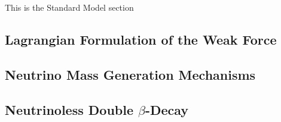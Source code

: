 This is the Standard Model section
\subsection{Lagrangian Formulation of the Weak Force}
\subsection{Neutrino Mass Generation Mechanisms}
\subsection{Neutrinoless Double $\beta$-Decay}